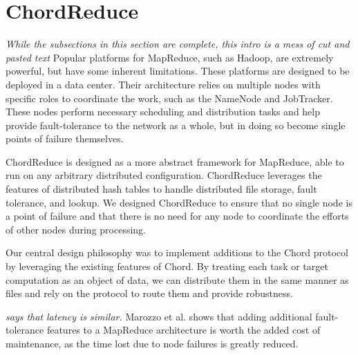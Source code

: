 \section{ChordReduce}
\textit{While the subsections in this section are complete, this intro is a mess of cut and pasted text}
Popular platforms for MapReduce, such as Hadoop, are extremely powerful, but have some inherent limitations.  
These platforms are designed to be deployed in a data center.  
Their architecture relies on multiple nodes with specific roles to coordinate the work, such as the NameNode and JobTracker.
These nodes perform necessary scheduling and distribution tasks and help provide fault-tolerance to the network as a whole, but in doing so become single points of failure themselves.

ChordReduce is designed as a more abstract framework for MapReduce, able to run on any arbitrary distributed configuration.
ChordReduce leverages the features of distributed hash tables to handle distributed file storage, fault tolerance, and lookup.  We designed ChordReduce to ensure that no single node is a point of failure and that there is no need for any node to coordinate the efforts of other nodes during processing.  



Our central design philosophy was to implement additions to the Chord protocol by leveraging the existing features of Chord.  By treating each task or target computation as an object of data, we can distribute them in the same manner as files and rely on the protocol to route them and provide robustness.

\textit{\cite{leemap} says that latency is similar.}  Marozzo et al. \cite{marozzo2012p2p} shows that adding additional fault-tolerance features to a MapReduce architecture is worth the added cost of maintenance, as the time lost due to node failures is greatly reduced.

